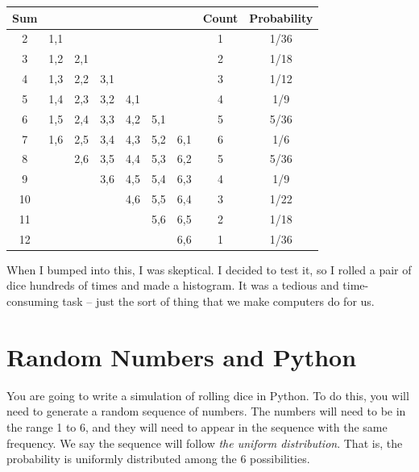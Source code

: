 \begin{tabular}{c| c c c c c c | c | c}
  Sum &     &     &     &     &     &     & Count & Probability \\
  \hline
  2   & 1,1 &     &     &     &     &     &   1    & 1/36 \\
  3   & 1,2 & 2,1 &     &     &     &     &   2    & 1/18 \\
  4   & 1,3 & 2,2 & 3,1 &     &     &     &   3    & 1/12 \\
  5   & 1,4 & 2,3 & 3,2 & 4,1 &     &     &   4    & 1/9 \\
  6   & 1,5 & 2,4 & 3,3 & 4,2 & 5,1 &     &   5    & 5/36 \\
  7   & 1,6 & 2,5 & 3,4 & 4,3 & 5,2 & 6,1 &   6    & 1/6 \\
  8   &     & 2,6 & 3,5 & 4,4 & 5,3 & 6,2 &   5    & 5/36 \\
  9   &     &     & 3,6 & 4,5 & 5,4 & 6,3 &   4    & 1/9 \\
  10  &     &     &     & 4,6 & 5,5 & 6,4 &   3    & 1/22 \\
  11  &     &     &     &     & 5,6 & 6,5 &   2    & 1/18 \\
  12  &     &     &     &     &     & 6,6 &   1    & 1/36
\end{tabular}

When I bumped into this, I was skeptical. I decided to test it, so I
rolled a pair of dice hundreds of times and made a histogram. It was a
tedious and time-consuming task -- just the sort of thing that we make
computers do for us.

\section{Random Numbers and Python}

You are going to write a simulation of rolling dice in Python. To do
this, you will need to generate a random sequence of numbers. The
numbers will need to be in the range 1 to 6, and they will need to
appear in the sequence with the same frequency.  We say the sequence
will follow \textit{the uniform distribution}.  That is, the
probability is uniformly distributed among the 6 possibilities.

